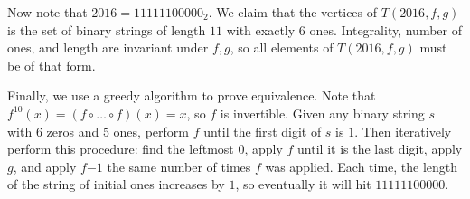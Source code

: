 \documentclass[10pt]{article}
\begin{document}
\begin{enumerate}
Now note that $2016=11111100000_2$. We claim that the vertices of $T(2016,f,g)$ is the set of binary strings of length $11$ with exactly $6$ ones. Integrality, number of ones, and length are invariant under $f,g$, so all elements of $T(2016,f,g)$ must be of that form.

Finally, we use a greedy algorithm to prove equivalence. Note that $f^{10}(x)=(f\circ\dots\circ f)(x)=x$, so $f$ is invertible. Given any binary string $s$ with $6$ zeros and $5$ ones, perform $f$ until the first digit of $s$ is $1$. Then iteratively perform this procedure: find the leftmost $0$, apply $f$ until it is the last digit, apply $g$, and apply $f{-1}$ the same number of times $f$ was applied. Each time, the length of the string of initial ones increases by $1$, so eventually it will hit $11111100000$.
\end{enumerate}
\end{document}
